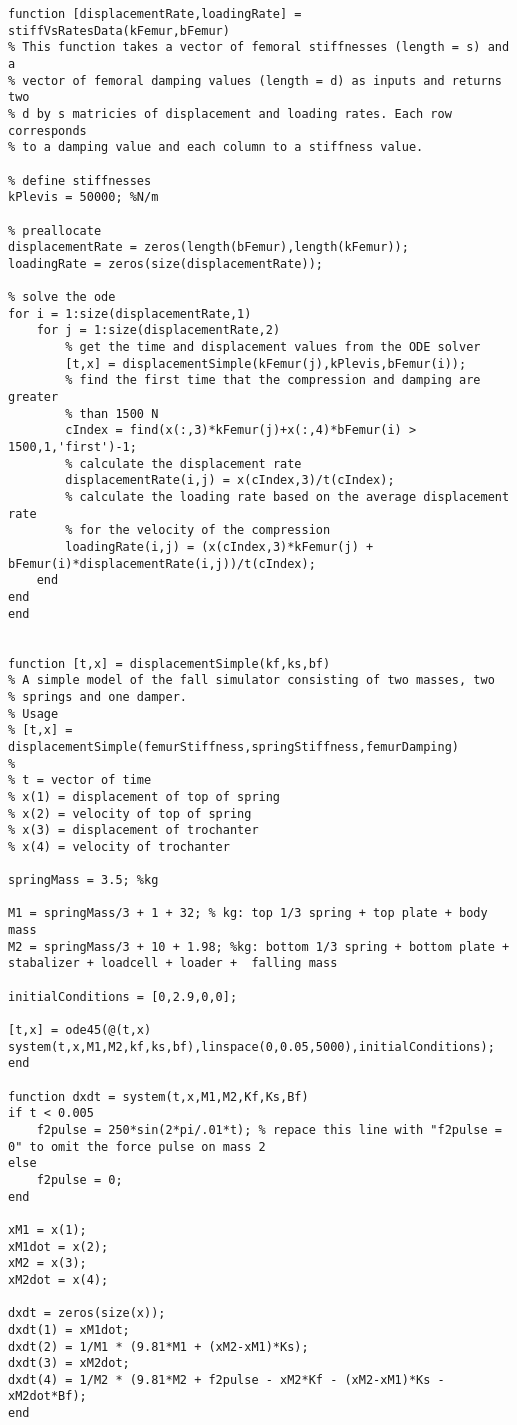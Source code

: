 \begin{lstlisting}
function [displacementRate,loadingRate] = stiffVsRatesData(kFemur,bFemur)
% This function takes a vector of femoral stiffnesses (length = s) and a 
% vector of femoral damping values (length = d) as inputs and returns two
% d by s matricies of displacement and loading rates. Each row corresponds
% to a damping value and each column to a stiffness value.

% define stiffnesses
kPlevis = 50000; %N/m

% preallocate
displacementRate = zeros(length(bFemur),length(kFemur));
loadingRate = zeros(size(displacementRate));

% solve the ode
for i = 1:size(displacementRate,1)
    for j = 1:size(displacementRate,2)
        % get the time and displacement values from the ODE solver
        [t,x] = displacementSimple(kFemur(j),kPlevis,bFemur(i));
        % find the first time that the compression and damping are greater
        % than 1500 N
        cIndex = find(x(:,3)*kFemur(j)+x(:,4)*bFemur(i) > 1500,1,'first')-1;
        % calculate the displacement rate
        displacementRate(i,j) = x(cIndex,3)/t(cIndex);
        % calculate the loading rate based on the average displacement rate
        % for the velocity of the compression
        loadingRate(i,j) = (x(cIndex,3)*kFemur(j) + bFemur(i)*displacementRate(i,j))/t(cIndex);
    end
end
end


function [t,x] = displacementSimple(kf,ks,bf)
% A simple model of the fall simulator consisting of two masses, two
% springs and one damper.
% Usage
% [t,x] = displacementSimple(femurStiffness,springStiffness,femurDamping)
%
% t = vector of time
% x(1) = displacement of top of spring
% x(2) = velocity of top of spring
% x(3) = displacement of trochanter
% x(4) = velocity of trochanter

springMass = 3.5; %kg

M1 = springMass/3 + 1 + 32; % kg: top 1/3 spring + top plate + body mass
M2 = springMass/3 + 10 + 1.98; %kg: bottom 1/3 spring + bottom plate + stabalizer + loadcell + loader +  falling mass

initialConditions = [0,2.9,0,0];

[t,x] = ode45(@(t,x) system(t,x,M1,M2,kf,ks,bf),linspace(0,0.05,5000),initialConditions);
end

function dxdt = system(t,x,M1,M2,Kf,Ks,Bf)
if t < 0.005
    f2pulse = 250*sin(2*pi/.01*t); % repace this line with "f2pulse = 0" to omit the force pulse on mass 2
else
    f2pulse = 0;
end

xM1 = x(1);
xM1dot = x(2);
xM2 = x(3);
xM2dot = x(4);

dxdt = zeros(size(x));
dxdt(1) = xM1dot;
dxdt(2) = 1/M1 * (9.81*M1 + (xM2-xM1)*Ks);
dxdt(3) = xM2dot;
dxdt(4) = 1/M2 * (9.81*M2 + f2pulse - xM2*Kf - (xM2-xM1)*Ks - xM2dot*Bf);
end
\end{lstlisting}
